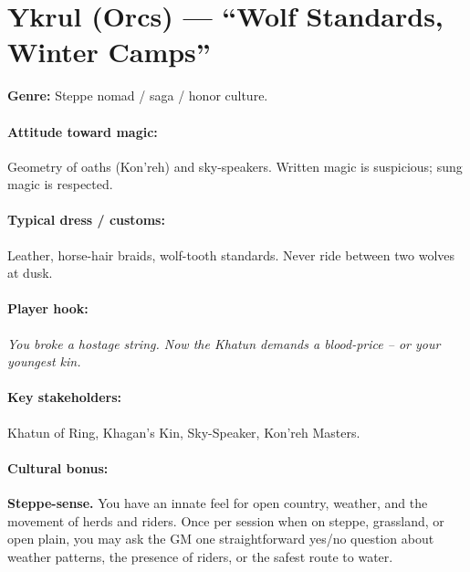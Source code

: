 \section{Ykrul (Orcs) --- ``Wolf Standards, Winter Camps''}
\textbf{Genre:} Steppe nomad / saga / honor culture.

\paragraph{Attitude toward magic:} Geometry of oaths (Kon'reh) and sky-speakers. Written magic is suspicious; sung magic is respected.

\paragraph{Typical dress / customs:} Leather, horse-hair braids, wolf-tooth standards. Never ride between two wolves at dusk.

\paragraph{Player hook:} \emph{You broke a hostage string. Now the Khatun demands a blood-price -- or your youngest kin.}

\paragraph{Key stakeholders:} Khatun of Ring, Khagan's Kin, Sky-Speaker, Kon'reh Masters.

\paragraph{Cultural bonus:} \textbf{Steppe-sense.} You have an innate feel for open country, weather, and the movement of herds and riders. Once per session when on steppe, grassland, or open plain, you may ask the GM one straightforward yes/no question about weather patterns, the presence of riders, or the safest route to water.

